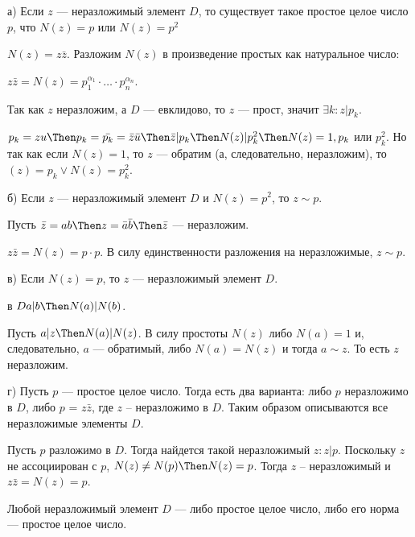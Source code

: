 \begin{solution}
	а) Если \(z\) --- неразложимый элемент \(D\), то существует такое простое целое число \(p\), что \(N(z) = p\) или \(N(z) = p^2\)
	
	\(N(z) = z\bar{z}\). Разложим \(N(z)\) в произведение простых как натуральное число:
	
	\(z\bar{z} = N(z) = p_1^{\alpha_1} \cdot \ldots \cdot p_n^{\alpha_n}\).
	
	Так как \(z\) неразложим, а \(D\) --- евклидово, то \(z\) --- прост, значит \(\exists k: z | p_k\).
	
	\(p_k = zu \Then p_k = \bar{p_k} = \bar{z}\bar{u} \Then \bar{z} | p_k \Then N(z) | p_k^2 \Then N(z) = 1, p_k\) или \(p_k^2\). Но так как если \(N(z) = 1\), то \(z\) --- обратим (а, следовательно, неразложим), то \((z) = p_k \lor N(z) = p_k^2\).
	
	б) Если \(z\) --- неразложимый элемент \(D\) и \(N(z) = p^2\), то \(z \sim p\).
	
	Пусть \(\bar{z} = ab \Then z = \bar{a} \bar{b} \Then \bar{z}\) --- неразложим.
	
	\(z \bar{z} = N(z) = p \cdot p\). В силу единственности разложения на неразложимые, \(z \sim p\).
	
	в) Если \(N(z) = p\), то \(z\) --- неразложимый элемент \(D\).
	
	в \(D a|b \Then N(a) | N(b)\).
	
	Пусть \(a | z \Then N(a) | N(z)\). В силу простоты \(N(z)\) либо \(N(a) = 1\) и, следовательно, \(a\) --- обратимый, либо \(N(a) = N(z)\) и тогда \(a \sim z\). То есть \(z\) неразложим.
	
	г) Пусть \(p\) --- простое целое число. Тогда есть два варианта: либо \(p\) неразложимо в \(D\), либо \(p\) = \(z\bar{z}\), где \(z\) -- неразложимо в \(D\). Таким образом описываются все неразложимые элементы \(D\).
	
	Пусть \(p\) разложимо в \(D\). Тогда найдется такой неразложимый \(z: z|p\). Поскольку \(z\) не ассоциирован с \(p\), \(N(z) \ne N(p) \Then N(z) = p\). Тогда \(z\) -- неразложимый и \(z\bar{z} = N(z) = p\).
	
	Любой неразложимый элемент \(D\) --- либо простое целое число, либо его норма --- простое целое число.
\end{solution}


